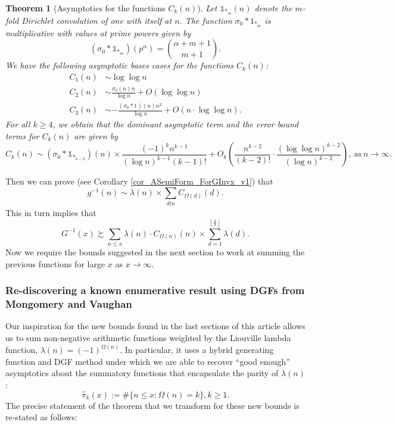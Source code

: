 \documentclass[11pt,reqno,a4letter]{article}
\numberwithin{figure}{section}
\numberwithin{table}{section}
\newcommand{\Floor}[2]{\ensuremath{\left\lfloor \frac{#1}{#2} \right\rfloor}}
\theoremstyle{plain}
\newtheorem{theorem}{Theorem}
\numberwithin{theorem}{section}
\theoremstyle{definition}
\begin{document}
\begin{theorem}[Asymptotics for the functions $C_k(n)$] 
\label{theorem_Ckn_GeneralAsymptoticsForms} 
Let $\mathds{1}_{\ast_m}(n)$ denote the $m$-fold Dirichlet convolution of one with itself at $n$. 
The function $\sigma_0 \ast 1_{\ast_m}$ is multiplicative with values at prime powers 
given by 
\[
(\sigma_0 \ast \mathds{1}_{\ast_m})(p^{\alpha}) = \binom{\alpha+m+1}{m+1}. 
\]
We have the following asymptotic bases cases for the functions $C_k(n)$: 
\begin{align*} 
C_1(n) & \sim \log\log n \\ 
C_2(n) & \sim \frac{\sigma_0(n) n}{\log n} + O(\log\log n) \\ 
C_3(n) & \sim -\frac{(\sigma_0 \ast 1)(n) n^2}{\log n} + 
     O\left(n \cdot \log\log n\right). 
\end{align*} 
For all $k \geq 4$, we obtain that the dominant asymptotic term and the error bound terms for 
$C_k(n)$ are given by 
\[
C_k(n) \sim (\sigma_0 \ast \mathds{1}_{\ast_{k-2}})(n) \times \frac{(-1)^{k} n^{k-1}}{(\log n)^{k-1} (k-1)!} + 
     O_k\left(\frac{n^{k-2}}{(k-2)!} \cdot \frac{(\log\log n)^{k-2}}{(\log n)^{k-2}}\right), 
     \mathrm{\ as\ }n \rightarrow \infty. 
\]
\end{theorem} 

Then we can prove (see Corollary \ref{cor_ASemiForm_ForGInvx_v1}) that 
\[
g^{-1}(n) \sim \lambda(n) \times \sum_{d|n} C_{\Omega(d)}(d). 
\]
This in turn implies that 
\[
G^{-1}(x) \succsim \sum_{n \leq x} \lambda(n) \cdot C_{\Omega(n)}(n) \times 
     \sum_{d=1}^{\Floor{x}{n}} \lambda(d). 
\]
Now we require the bounds suggested in the next section to work at summing the 
previous functions for large $x$ as $x \rightarrow \infty$. 

\subsubsection{Re-discovering a known enumerative result using DGFs from Mongomery and Vaughan} 

Our inspiration for the new bounds found in the last sections of this article allows us to sum 
non-negative arithmetic functions weighted by the Liouville lambda function, 
$\lambda(n) = (-1)^{\Omega(n)}$. In particular, it uses a hybrid generating function and DGF method 
under which we are able to recover ``good enough'' asymptotics about the summatory functions that 
encapsulate the parity of $\lambda(n)$: 
\[
\widehat{\pi}_k(x) := \#\{n \leq x: \Omega(n) = k\}, k \geq 1. 
\] 
The precise statement of the theorem that we transform for these new bounds is re-stated as follows: 
\end{document}
